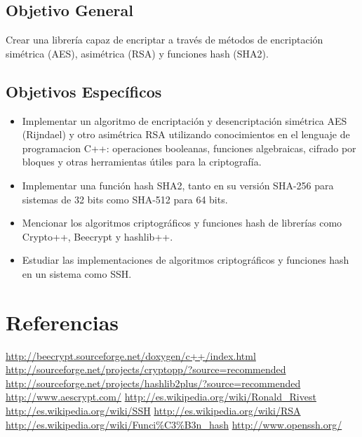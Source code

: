 \documentclass[spanish]{article}
\begin{document}
\subsection{Objetivo General}
Crear una librería capaz de encriptar a través de métodos de encriptación simétrica (AES), asimétrica (RSA) y funciones hash (SHA2). 

\subsection{Objetivos Específicos}
\begin{itemize}
\item Implementar un algoritmo de encriptación y desencriptación simétrica AES (Rijndael) y otro asimétrica RSA utilizando conocimientos en el lenguaje de programacion C++: operaciones booleanas, funciones algebraicas, cifrado por bloques y otras herramientas útiles para la criptografía.
\item Implementar una función hash SHA2, tanto en su versión SHA-256 para sistemas de 32 bits como SHA-512 para 64 bits.
\item Mencionar los algoritmos criptográficos y funciones hash de librerías como Crypto++, Beecrypt y hashlib++.
\item Estudiar las implementaciones de algoritmos criptográficos y funciones hash en un sistema como SSH.
\end{itemize}

\section{Referencias}
\begin{thebibliography}{9}

\bibitem{}\url{http://beecrypt.sourceforge.net/doxygen/c++/index.html}
\bibitem{}\url{http://sourceforge.net/projects/cryptopp/?source=recommended}
\bibitem{}\url{http://sourceforge.net/projects/hashlib2plus/?source=recommended}
\bibitem{}\url{http://www.aescrypt.com/}
\bibitem{}\url{http://es.wikipedia.org/wiki/Ronald_Rivest}
\bibitem{}\url{http://es.wikipedia.org/wiki/SSH}
\bibitem{}\url{http://es.wikipedia.org/wiki/RSA}
\bibitem{}\url{http://es.wikipedia.org/wiki/Funci%C3%B3n_hash}
\bibitem{}\url{http://www.openssh.org/}


\end{thebibliography}
\end{document}
